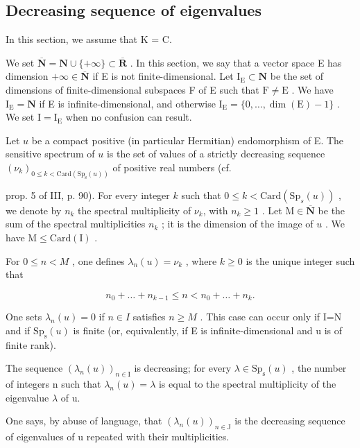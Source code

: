 \subsection{Decreasing sequence of eigenvalues}

In this section, we assume that K = C.

We set \(\overline{\mathbf{N}} = \mathbf{N} \cup \{+\infty\} \subset \overline{\mathbf{R}}\) . In this section, we say that a vector space E has dimension \(+\infty \in \overline{\mathbf{N}}\) if E is not finite-dimensional. Let \(\mathrm{I_E} \subset \mathbf{N}\) be the set of dimensions of finite-dimensional subspaces F of E such that \(\mathrm{F} \neq \mathrm{E}\) . We have \(\mathrm{I_E} = \mathbf{N}\) if E is infinite-dimensional, and otherwise \(\mathrm{I_E} = \{0, \ldots, \dim(\mathrm{E}) - 1\}\) . We set \(\mathrm{I} = \mathrm{I_E}\) when no confusion can result.

Let \(u\) be a compact positive (in particular Hermitian) endomorphism of E. The sensitive spectrum of \(u\) is the set of values of a strictly decreasing sequence \((\nu_{k})_{0\leqslant k<\mathrm{Card}(\mathrm{Sp}_{\mathrm{s}}(u))}\) of positive real numbers (cf.

prop. 5 of III, p. 90). For every integer \(k\) such that \(0 \leqslant k < \text{Card}(\text{Sp}_s(u))\) , we denote by \(n_k\) the spectral multiplicity of \(\nu_k\), with \(n_k \geqslant 1\) . Let \(\text{M} \in \overline{\mathbf{N}}\) be the sum of the spectral multiplicities \(n_k\) ; it is the dimension of the image of \(u\) . We have \(\text{M} \leqslant \text{Card}(\text{I})\) .

For \(0 \leqslant n < M\) , one defines \(\lambda_n(u) = \nu_k\) , where \(k \geqslant 0\) is the unique integer such that

\[
n _ {0} + \dots + n _ {k - 1} \leqslant n <   n _ {0} + \dots + n _ {k}.
\]

One sets \(\lambda_{n}(u)=0\) if \(n\in I\) satisfies \(n\geqslant M\) . This case can occur only if I=N and if \(\mathrm{Sp}_{\mathrm{s}}(u)\) is finite (or, equivalently, if E is infinite-dimensional and u is of finite rank).

The sequence \((\lambda_{n}(u))_{n\in\mathrm{I}}\) is decreasing; for every \(\lambda\in\mathrm{Sp}_{\mathrm{s}}(u)\) , the number of integers n such that \(\lambda_{n}(u)=\lambda\) is equal to the spectral multiplicity of the eigenvalue \(\lambda\) of u.

One says, by abuse of language, that \((\lambda_{n}(u))_{n\in\mathrm{J}}\) is the decreasing sequence of eigenvalues of u repeated with their multiplicities.

